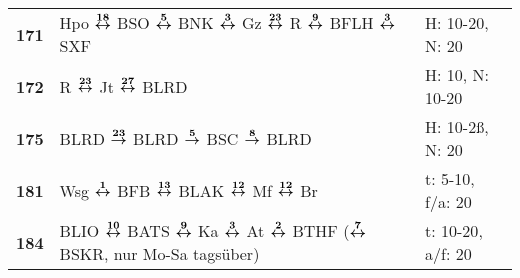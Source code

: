 \begin{minipage}[t]{0.45\textwidth}
\begin{tabular}{>{\bfseries}L{1.2cm}L{9.0cm}L{3.0cm}}
\bus{} 171    & Hpo $\xarwe{18}$ BSO $\xarwe{5}$ BNK $\xarwe{3}$ Gz $\xarwe{23}$ R $\xarwe{9}$ BFLH $\xarwe{3}$ SXF                                                                 & H: 10-20, N: 20            \\
\bus{} 172    & R $\xarwe{23}$ Jt $\xarwe{27}$ BLRD                                                                                                                                 & H: 10, N: 10-20            \\
\bus{} 175    & BLRD $\xarre{23}$ BLRD $\xarre{5}$ BSC $\xarre{8}$ BLRD                                                                                                             & H: 10-2ß, N: 20            \\
\bus{} 181    & Wsg $\xarwe{1}$ BFB $\xarwe{13}$ BLAK $\xarwe{12}$ Mf $\xarwe{12}$ Br                                                                                               & t: 5-10, f/a: 20           \\
\bus{} 184    & BLIO $\xarwe{10}$ BATS $\xarwe{9}$ Ka $\xarwe{3}$ At $\xarwe{2}$ BTHF ($\xarwe{7}$ BSKR, nur Mo-Sa tagsüber)                                                        & t: 10-20, a/f: 20          \\
\hline
\end{tabular}
\end{minipage}
\begin{minipage}[t]{0.05\textwidth}
\phantom{Tor}
\end{minipage}

